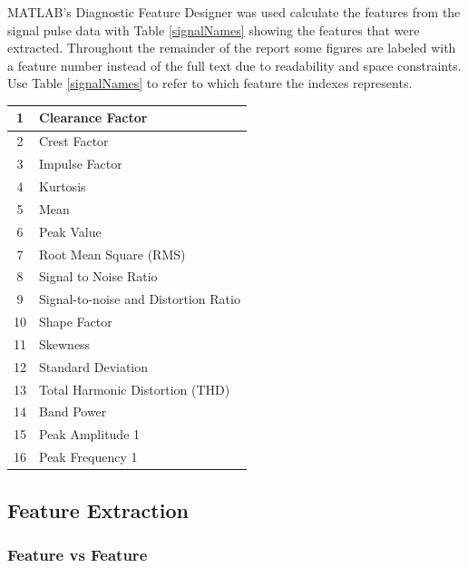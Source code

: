 \documentclass[]{article}
\begin{document}
MATLAB's Diagnostic Feature Designer was used calculate the features from the signal pulse data with Table \ref{signalNames} showing the features that were extracted. Throughout the remainder of the report some figures are labeled with a feature number instead of the full text due to readability and space constraints. Use Table \ref{signalNames} to refer to which feature the indexes represents.
\begin{center}
\label{featureNames}
\begin{tabular}{ |c|l| }
 \hline
 1 & Clearance Factor \\
 \hline
 2 & Crest Factor \\
 \hline
 3 & Impulse Factor \\
 \hline
 4 & Kurtosis \\
 \hline
 5 & Mean \\
 \hline
 6 & Peak Value \\
 \hline
 7 & Root Mean Square (\gls{RMS}) \\ 
 \hline              
 8 & Signal to Noise Ratio  \\
 \hline
 9 & Signal-to-noise and Distortion Ratio  \\
 \hline
 10 & Shape Factor \\
 \hline
 11 & Skewness \\
 \hline
 12 & Standard Deviation \\
 \hline
 13 & Total Harmonic Distortion (THD) \\
 \hline
 14 & Band Power \\
 \hline
 15 & Peak Amplitude 1 \\
 \hline
 16 & Peak Frequency 1 \\
 \hline
\end{tabular}
\end{center}

\subsection{Feature Extraction}
\subsubsection*{Feature vs Feature}
\end{document}
